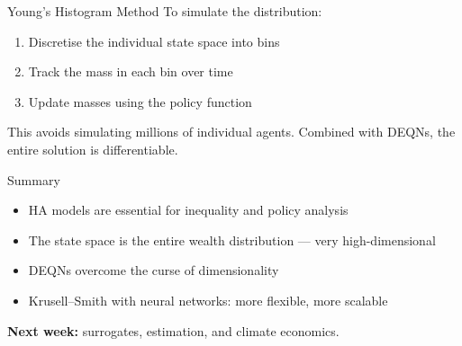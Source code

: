\documentclass[aspectratio=169, 10pt]{beamer}
\begin{document}
\begin{frame}{Young's Histogram Method}
To simulate the distribution:

\bigskip
\begin{enumerate}
\item Discretise the individual state space into bins
\item Track the mass in each bin over time
\item Update masses using the policy function
\end{enumerate}

\bigskip
This avoids simulating millions of individual agents. Combined with DEQNs, the entire solution is differentiable.
\end{frame}

\begin{frame}{Summary}
\begin{itemize}
\item HA models are essential for inequality and policy analysis
\item The state space is the entire wealth distribution --- very high-dimensional
\item DEQNs overcome the curse of dimensionality
\item Krusell--Smith with neural networks: more flexible, more scalable
\end{itemize}

\bigskip
\textbf{Next week:} surrogates, estimation, and climate economics.
\end{frame}
\end{document}
